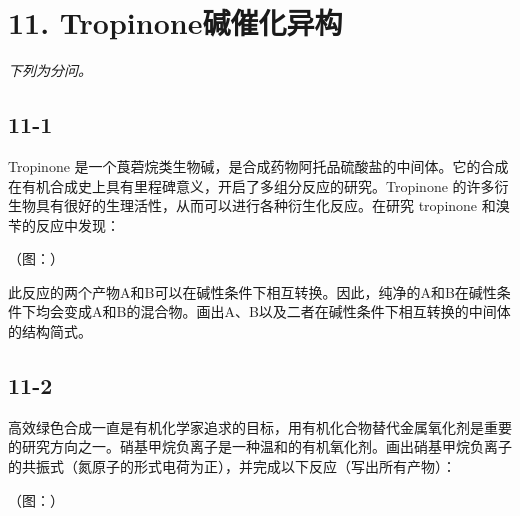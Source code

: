 \section*{11. Tropinone碱催化异构}
\textit{下列为分问。}

\subsection*{11-1}
Tropinone 是⼀个莨菪烷类⽣物碱，是合成药物阿托品硫酸盐的中间体。它的合成在有机合成史上具有⾥程碑意义，开启了多组分反应的研究。Tropinone 的许多衍⽣物具有很好的⽣理活性，从⽽可以进⾏各种衍⽣化反应。在研究 tropinone 和溴苄的反应中发现：

（图：）

此反应的两个产物A和B可以在碱性条件下相互转换。因此，纯净的A和B在碱性条件下均会变成A和B的混合物。画出A、B以及⼆者在碱性条件下相互转换的中间体的结构简式。

\subsection*{11-2}
⾼效绿⾊合成⼀直是有机化学家追求的⽬标，⽤有机化合物替代⾦属氧化剂是重要的研究⽅向之⼀。硝基甲烷负离⼦是⼀种温和的有机氧化剂。画出硝基甲烷负离⼦的共振式（氮原⼦的形式电荷为正），并完成以下反应（写出所有产物）：

（图：）
